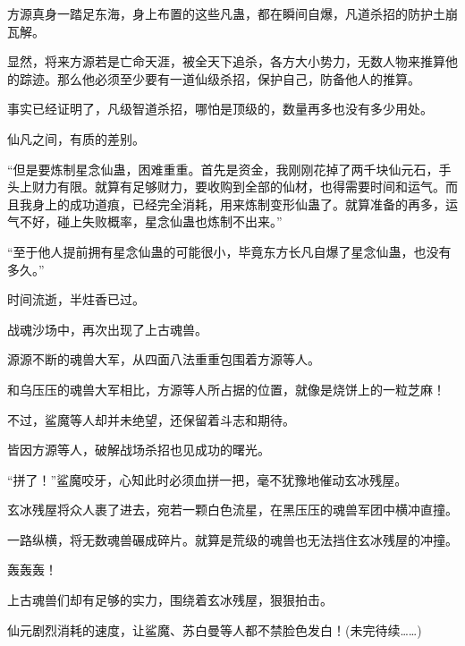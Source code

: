 \begin{this_body}
方源真身一踏足东海，身上布置的这些凡蛊，都在瞬间自爆，凡道杀招的防护土崩瓦解。

显然，将来方源若是亡命天涯，被全天下追杀，各方大小势力，无数人物来推算他的踪迹。那么他必须至少要有一道仙级杀招，保护自己，防备他人的推算。

事实已经证明了，凡级智道杀招，哪怕是顶级的，数量再多也没有多少用处。

仙凡之间，有质的差别。

“但是要炼制星念仙蛊，困难重重。首先是资金，我刚刚花掉了两千块仙元石，手头上财力有限。就算有足够财力，要收购到全部的仙材，也得需要时间和运气。而且我身上的成功道痕，已经完全消耗，用来炼制变形仙蛊了。就算准备的再多，运气不好，碰上失败概率，星念仙蛊也炼制不出来。”

“至于他人提前拥有星念仙蛊的可能很小，毕竟东方长凡自爆了星念仙蛊，也没有多久。”

时间流逝，半炷香已过。

战魂沙场中，再次出现了上古魂兽。

源源不断的魂兽大军，从四面八法重重包围着方源等人。

和乌压压的魂兽大军相比，方源等人所占据的位置，就像是烧饼上的一粒芝麻！

不过，鲨魔等人却并未绝望，还保留着斗志和期待。

皆因方源等人，破解战场杀招也见成功的曙光。

“拼了！”鲨魔咬牙，心知此时必须血拼一把，毫不犹豫地催动玄冰残屋。

玄冰残屋将众人裹了进去，宛若一颗白色流星，在黑压压的魂兽军团中横冲直撞。

一路纵横，将无数魂兽碾成碎片。就算是荒级的魂兽也无法挡住玄冰残屋的冲撞。

轰轰轰！

上古魂兽们却有足够的实力，围绕着玄冰残屋，狠狠拍击。

仙元剧烈消耗的速度，让鲨魔、苏白曼等人都不禁脸色发白！(未完待续……)

\end{this_body}

